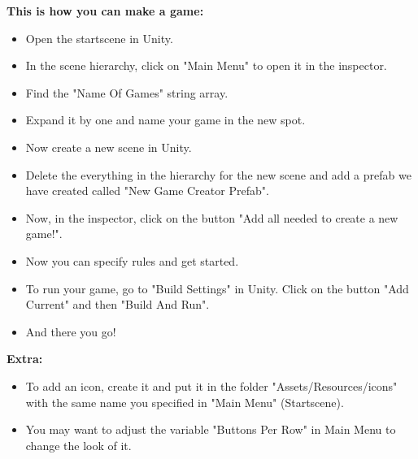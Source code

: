 	\textbf{This is how you can make a game:}
	\begin{itemize}
		\item Open the startscene in Unity.
		\item In the scene hierarchy, click on "Main Menu" to open it in the
			inspector.
		\item Find the "Name Of Games" string array.
		\item Expand it by one and name your game in the new spot.
		\item Now create a new scene in Unity.
		\item Delete the everything in the hierarchy for the new scene and add
			a prefab we have created called "New Game Creator Prefab".
		\item Now, in the inspector, click on the button "Add all needed to
			create a new game!".
		\item Now you can specify rules and get started.
		\item To run your game, go to "Build Settings" in Unity. Click on the
			button "Add Current" and then "Build And Run".
		\item And there you go!
	\end{itemize}

	\textbf{Extra:}
	\begin{itemize}
		\item To add an icon, create it and put it in the folder 
			"Assets/Resources/icons" with the same name you specified in "Main 
			Menu" (Startscene).
		\item You may want to adjust the variable "Buttons Per Row" in Main
			Menu to change the look of it.
	\end{itemize}
